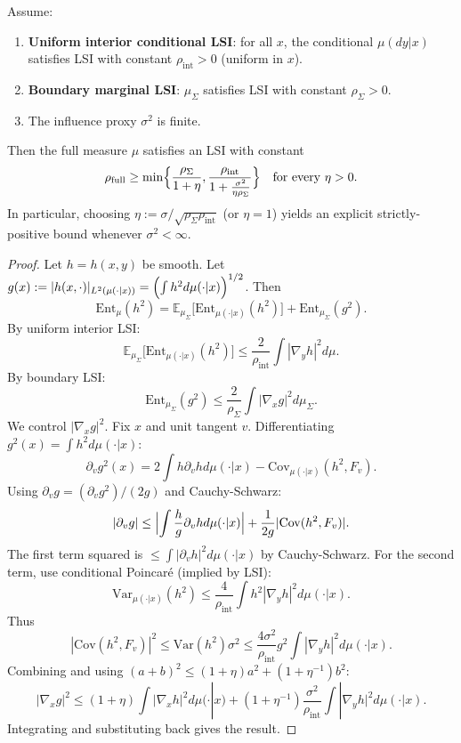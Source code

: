 \begin{theorem}
\label{thm:conditional-tensorization-corrected}
Assume:
\begin{enumerate}
\item \textbf{Uniform interior conditional LSI}: for all $x$, the conditional $\mu(dy|x)$ satisfies LSI with constant $\rho_{\mathrm{int}}>0$ (uniform in $x$).
\item \textbf{Boundary marginal LSI}: $\mu_\Sigma$ satisfies LSI with constant $\rho_\Sigma>0$.
\item The influence proxy $\sigma^2$ is finite.
\end{enumerate}

Then the full measure $\mu$ satisfies an LSI with constant
\[
\rho_{\mathrm{full}}
\ge
\min\Bigl\{\frac{\rho_\Sigma}{1+\eta}, \frac{\rho_{\mathrm{int}}}{1+\frac{\sigma^2}{\eta\rho_\Sigma}}\Bigr\}
\quad\text{for every }\eta>0.
\]
In particular, choosing $\eta:=\sigma/\sqrt{\rho_\Sigma\rho_{\mathrm{int}}}$ (or $\eta=1$) yields an explicit strictly-positive bound whenever $\sigma^2<\infty$.
\end{theorem}

\begin{proof}
Let $h=h(x,y)$ be smooth. Let $g(x):=|h(x,\cdot)|_{L^2(\mu(\cdot|x))}=\Bigl(\int h^2 d\mu(\cdot|x)\Bigr)^{1/2}$. Then
\[
\mathrm{Ent}_\mu(h^2)
=
\mathbb E_{\mu_\Sigma}\bigl[\mathrm{Ent}_{\mu(\cdot|x)}(h^2)\bigr]
+
\mathrm{Ent}_{\mu_\Sigma}(g^2).
\]
By uniform interior LSI:
\[
\mathbb E_{\mu_\Sigma}\bigl[\mathrm{Ent}_{\mu(\cdot|x)}(h^2)\bigr] \le \frac{2}{\rho_{\mathrm{int}}}\int |\nabla_y h|^2 d\mu.
\]
By boundary LSI:
\[
\mathrm{Ent}_{\mu_\Sigma}(g^2) \le \frac{2}{\rho_\Sigma}\int |\nabla_x g|^2 d\mu_\Sigma.
\]
We control $|\nabla_x g|^2$. Fix $x$ and unit tangent $v$. Differentiating $g^2(x)=\int h^2 d\mu(\cdot|x)$:
\[
\partial_v g^2(x)
=
2\int h \partial_v h d\mu(\cdot|x)
-\mathrm{Cov}_{\mu(\cdot|x)}(h^2,F_v).
\]
Using $\partial_v g=(\partial_v g^2)/(2g)$ and Cauchy-Schwarz:
\[
|\partial_v g|
\le
\Bigl|\int \frac{h}{g}\partial_v h d\mu(\cdot|x)\Bigr|
+
\frac{1}{2g}|\mathrm{Cov}(h^2,F_v)|.
\]
The first term squared is $\le \int|\partial_v h|^2 d\mu(\cdot|x)$ by Cauchy-Schwarz.
For the second term, use conditional Poincaré (implied by LSI):
\[
\mathrm{Var}_{\mu(\cdot|x)}(h^2) \le \frac{4}{\rho_{\mathrm{int}}}\int h^2|\nabla_y h|^2 d\mu(\cdot|x).
\]
Thus
\[
|\mathrm{Cov}(h^2,F_v)|^2 \le \mathrm{Var}(h^2)\sigma^2 \le \frac{4\sigma^2}{\rho_{\mathrm{int}}}g^2\int|\nabla_y h|^2 d\mu(\cdot|x).
\]
Combining and using $(a+b)^2 \le (1+\eta)a^2 + (1+\eta^{-1})b^2$:
\[
|\nabla_x g|^2
\le
(1+\eta)\int|\nabla_x h|^2 d\mu(\cdot|x)
+
(1+\eta^{-1})\frac{\sigma^2}{\rho_{\mathrm{int}}}\int|\nabla_y h|^2 d\mu(\cdot|x).
\]
Integrating and substituting back gives the result.
\end{proof}

